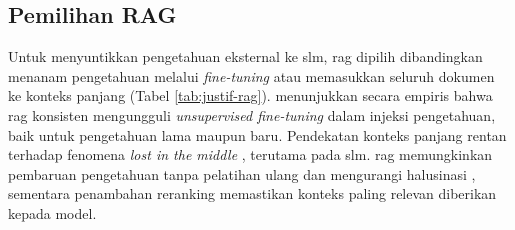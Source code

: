 \begin{table}[H]
    \centering
    \caption{Perbandingan LoRA dengan Alternatif Fine-Tuning}
    \label{tab:justif-lora}
\end{table}

\subsection{Pemilihan RAG}
Untuk menyuntikkan pengetahuan eksternal ke \gls{slm}, \gls{rag} dipilih dibandingkan menanam pengetahuan melalui \textit{fine-tuning} atau memasukkan seluruh dokumen ke konteks panjang (Tabel \ref{tab:justif-rag}). \citet{ovadia2024ftrag} menunjukkan secara empiris bahwa \gls{rag} konsisten mengungguli \textit{unsupervised fine-tuning} dalam injeksi pengetahuan, baik untuk pengetahuan lama maupun baru. Pendekatan konteks panjang rentan terhadap fenomena \textit{lost in the middle} \citep{liu2024lostmiddle}, terutama pada \gls{slm}. \gls{rag} memungkinkan pembaruan pengetahuan tanpa pelatihan ulang dan mengurangi halusinasi \citep{lewis2020rag, gao2023ragsurvey}, sementara penambahan \gls{reranking} memastikan konteks paling relevan diberikan kepada model.

